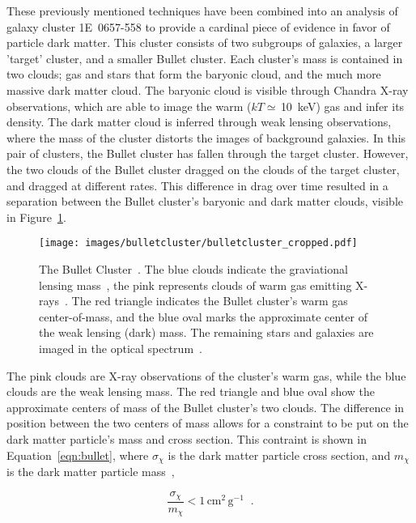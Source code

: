These previously mentioned techniques have been combined into an analysis of galaxy cluster \mbox{1E 0657-558} to provide a cardinal piece of evidence in favor of particle dark matter.
This cluster consists of two subgroups of galaxies, a larger 'target' cluster, and a smaller Bullet cluster.
Each cluster's mass is contained in two clouds; gas and stars that form the baryonic cloud, and the much more massive dark matter cloud.
The baryonic cloud is visible through Chandra X-ray observations, which are able to image the warm ($kT\simeq\,$\SI{10}{keV}) gas and infer its density.
The dark matter cloud is inferred through weak lensing observations, where the mass of the cluster distorts the images of background galaxies.
In this pair of clusters, the Bullet cluster has fallen through the target cluster.
However, the two clouds of the Bullet cluster dragged on the clouds of the target cluster, and dragged at different rates.
This difference in drag over time resulted in a separation between the Bullet cluster's baryonic and dark matter clouds, visible in Figure~\ref{fig:bullet}.

\begin{figure}[!ht]
  \centering
  \texttt{[image: images/bulletcluster/bulletcluster\_cropped.pdf]}
  \caption[The Bullet Cluster]{
    The Bullet Cluster~\cite{bullet_cluster_combined_image}.
    The blue clouds indicate the graviational lensing mass~\cite{bullet_cluster}, the pink represents clouds of warm gas emitting X-rays~\cite{bullet_cluster_chandramap}.
    The red triangle indicates the Bullet cluster's warm gas center-of-mass, and the blue oval marks the approximate center of the weak lensing (dark) mass.
    The remaining stars and galaxies are imaged in the optical spectrum~\cite{bullet_cluster_composite}.}
  \label{fig:bullet}
\end{figure}
    
The pink clouds are X-ray observations of the cluster's warm gas, while the blue clouds are the weak lensing mass.
The red triangle and blue oval show the approximate centers of mass of the Bullet cluster's two clouds.
The difference in position between the two centers of mass allows for a constraint to be put on the dark matter particle's mass and cross section.
This contraint is shown in Equation~\ref{eqn:bullet}, where $\sigma_{\chi}$ is the dark matter particle cross section, and $m_{\chi}$ is the dark matter particle mass~\cite{bullet_cluster,bullet_cluster2},

\begin{equation}\label{eqn:bullet}
  \frac{\sigma_{\chi}}{m_{\chi}} < 1 \, \textrm{cm}^2 \, \textrm{g}^{-1} \;\; .
\end{equation}

